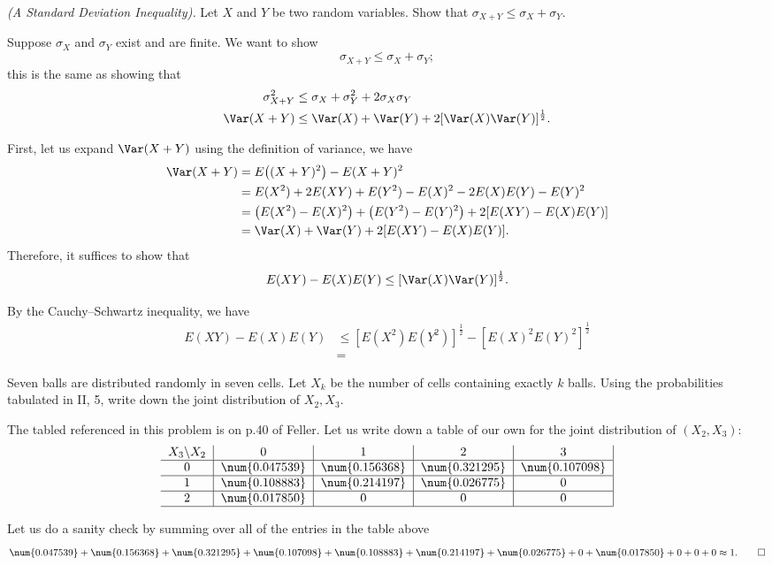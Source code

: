 \begin{problem}[Handout 15, \# 16]
  \emph{(A Standard Deviation Inequality).} Let \(X\) and \(Y\) be two
  random variables. Show that \(\sigma_{X+Y}\leq\sigma_X+\sigma_Y\).
\end{problem}
\begin{solution}
  Suppose \(\sigma_X\) and \(\sigma_Y\) exist and are finite. We want to
  show
  \[
    \sigma_{X+Y}\leq\sigma_X+\sigma_Y;
  \]
  this is the same as showing that
  \begin{align*}
    \sigma_{X+Y}^2
    &\leq\sigma_X+\sigma_Y^2+2\sigma_X\sigma_Y\\
    \Var(X+Y)&\leq\Var(X)+\Var(Y)+2[\Var(X)\Var(Y)]^{\frac{1}{2}}.
  \end{align*}

  First, let us expand \(\Var(X+Y)\) using the definition of variance, we
  have
  \begin{align*}
    \Var(X+Y)
    &=E\bigl((X+Y)^2\bigr)-E(X+Y)^2\\
    &=E(X^2)+2E(XY)+E(Y^2)-E(X)^2-2E(X)E(Y)-E(Y)^2\\
    &=\bigl(E(X^2)-E(X)^2\bigr)+\bigl(E(Y^2)-E(Y)^2\bigr)+2[E(XY)-E(X)E(Y)]\\
    &=\Var(X)+\Var(Y)+2[E(XY)-E(X)E(Y)].
  \end{align*}
  Therefore, it suffices to show that
  \[
    E(XY)-E(X)E(Y)\leq [\Var(X)\Var(Y)]^{\frac{1}{2}}.
  \]

  By the Cauchy--Schwartz inequality, we have
  \begin{align*}
    E(XY)-E(X)E(Y)
    &\leq
      {[E(X^2)E(Y^2)]}^{\frac{1}{2}}-{[E(X)^2E(Y)^2]}^{\frac{1}{2}}\\
    &=
  \end{align*}
\end{solution}
\newpage

\begin{problem}[Handout 15, \# 17]
  Seven balls are distributed randomly in seven cells. Let \(X_k\) be
  the number of cells containing exactly \(k\) balls. Using the
  probabilities tabulated in II, 5, write down the joint distribution of
  \(X_2,X_3\).
\end{problem}
\begin{solution}
  The tabled referenced in this problem is on p.\@ 40 of Feller. Let us
  write down a table of our own for the joint distribution of
  \((X_2,X_3)\):
  \[
    \begin{tabular}{c|c|c|c|c|}
      \(X_3\backslash X_2\)&0&1&2&3\\\hline
      0&\num{0.047539}&\num{0.156368}&\num{0.321295}&\num{0.107098}\\\hline
      1&\num{0.108883}&\num{0.214197}&\num{0.026775}&0\\\hline
      2&\num{0.017850}&0&0&0\\\hline
    \end{tabular}
  \]

  Let us do a sanity check by summing over all of the entries in the table
  above
  \[
    \num{0.047539}+\num{0.156368}+\num{0.321295}+\num{0.107098}+
    \num{0.108883}+\num{0.214197}+\num{0.026775}+0+\num{0.017850}+0+0+0\approx
    1.\qedhere
  \]
\end{solution}
\newpage

